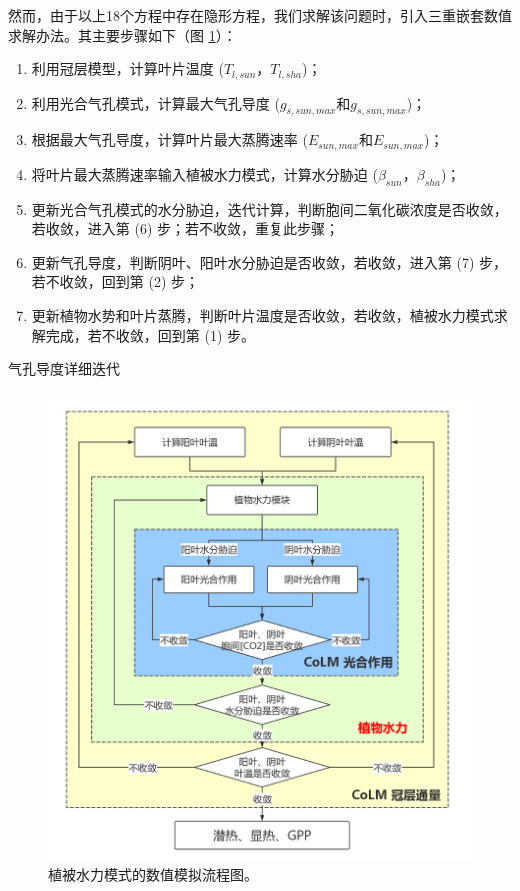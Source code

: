 然而，由于以上18个方程中存在隐形方程，我们求解该问题时，引入三重嵌套数值求解办法。其主要步骤如下（图 \ref{fig:植被水力模式的数值模拟流程图}）：
\begin{enumerate}
    \item 利用冠层模型，计算叶片温度 ($T_{l,sun}$，$T_{l,sha}$)；
    \item 利用光合气孔模式，计算最大气孔导度 ($g_{s,sun,max}$和$g_{s,sun,max}$)；
    \item 根据最大气孔导度，计算叶片最大蒸腾速率 ($E_{sun,max}$和$E_{sun,max}$)；
    \item 将叶片最大蒸腾速率输入植被水力模式，计算水分胁迫 ($\beta_{sun}$，$\beta_{sha}$)；
    \item 更新光合气孔模式的水分胁迫，迭代计算，判断胞间二氧化碳浓度是否收敛，若收敛，进入第 (6) 步；若不收敛，重复此步骤；
    \item 更新气孔导度，判断阴叶、阳叶水分胁迫是否收敛，若收敛，进入第 (7) 步，若不收敛，回到第 (2) 步；
    \item 更新植物水势和叶片蒸腾，判断叶片温度是否收敛，若收敛，植被水力模式求解完成，若不收敛，回到第 (1) 步。
\end{enumerate}

气孔导度详细迭代

{
    \begin{figure}[htbp]
    \centering
    \includegraphics{Figures/植被水力模式/植被水力模式的数值模拟流程图.png}
    \caption{植被水力模式的数值模拟流程图。}
    \label{fig:植被水力模式的数值模拟流程图}
    \end{figure}
}

